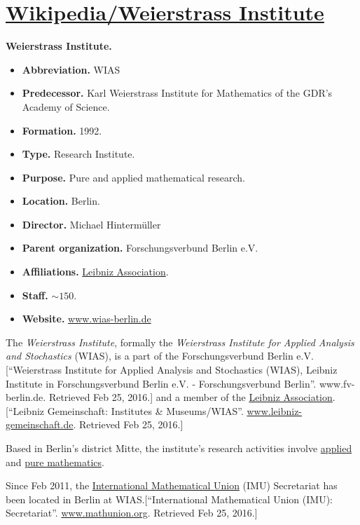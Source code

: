 \documentclass{book}
\numberwithin{equation}{section}
\begin{document}

\chapter{\href{https://en.wikipedia.org/wiki/Weierstrass_Institute}{Wikipedia/Weierstrass Institute}}

\textbf{Weierstrass Institute.}
\begin{itemize}
    \item \textbf{Abbreviation.} WIAS
    \item \textbf{Predecessor.} Karl Weierstrass Institute for Mathematics of the GDR's Academy of Science.
    \item \textbf{Formation.} 1992.
    \item \textbf{Type.} Research Institute.
    \item \textbf{Purpose.} Pure and applied mathematical research.
    \item \textbf{Location.} Berlin.
    \item \textbf{Director.} Michael Hintermüller
    \item \textbf{Parent organization.} Forschungsverbund Berlin e.V.
    \item \textbf{Affiliations.} \href{https://en.wikipedia.org/wiki/Leibniz_Association}{Leibniz Association}.
    \item \textbf{Staff.} $\sim 150$.
    \item \textbf{Website.} \href{http://www.wias-berlin.de/index.jsp?lang=1}{www.wias-berlin.de}
\end{itemize}
The \textit{Weierstrass Institute}, formally the \textit{Weierstrass Institute for Applied Analysis and Stochastics} (WIAS), is a part of the Forschungsverbund Berlin e.V.[``Weierstrass Institute for Applied Analysis and Stochastics (WIAS), Leibniz Institute in Forschungsverbund Berlin e.V. - Forschungsverbund Berlin''. www.fv-berlin.de. Retrieved Feb 25, 2016.] and a member of the \href{https://en.wikipedia.org/wiki/Leibniz_Association}{Leibniz Association}.[``Leibniz Gemeinschaft: Institutes \& Museums/WIAS''. \url{www.leibniz-gemeinschaft.de}. Retrieved Feb 25, 2016.]

Based in Berlin's district Mitte, the institute's research activities involve \href{https://en.wikipedia.org/wiki/Applied_mathematics}{applied} and \href{https://en.wikipedia.org/wiki/Pure_mathematics}{pure mathematics}.

%
Since Feb 2011, the \href{https://en.wikipedia.org/wiki/International_Mathematical_Union}{International Mathematical Union} (IMU) Secretariat has been located in Berlin at WIAS.[``International Mathematical Union (IMU): Secretariat''. \url{www.mathunion.org}. Retrieved Feb 25, 2016.]
\end{document}

